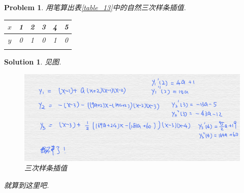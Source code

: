 \documentclass[a4paper, 12pt]{ctexart}
\title{\TITLE}
\author{\AUTHOR}
\date{\today}
\let\oldtable\table
\let\oldendtable\endtable
\renewenvironment{table}
    {\par\nolinenumbers\oldtable}
    {\oldendtable\endnolinenumbers\par}
\theoremstyle{plain}
\newtheorem{problem}{Problem}[section]
\theoremstyle{plain}
\theoremstyle{plain}
\theoremstyle{nonumberplain}
\newtheorem{solution}{Solution}
\begin{document}

    \maketitle
    \thispagestyle{empty}





    \newpage
    \pagestyle{fancy}
    \linenumbers

    \begin{problem}
        \label{problem_13}
        用笔算出表\ref{table_13}中的自然三次样条插值.
        \begin{table}[H]
            \begin{center}
                \caption{习题\ref{problem_13}中给定的三次样条数据}
                \label{table_13}
                \begin{tabular}{cccccc}
                    \Xhline{1.2pt}
                    $x$ & 1 & 2 & 3 & 4 & 5\\
                    \hline
                    $y$ & 0 & 1 & 0 & 1 & 0\\
                    \Xhline{1.2pt}
                \end{tabular}
            \end{center}
        \end{table}
    \end{problem}

    \begin{solution}
        见图.
        \begin{figure}[H]
            \centering
            \includegraphics[scale=0.2]{13.jpg}
            \caption{三次样条插值}
        \end{figure}
        就算到这里吧.
    \end{solution}
\end{document}
